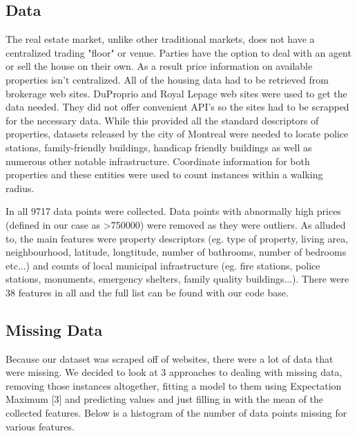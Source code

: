 \documentclass{acm_proc_article-sp}
\begin{document}
\subsection{Data}

	The real estate market, unlike other traditional markets, does not have a centralized trading "floor" or venue. Parties have the option to deal with an agent or sell the house on their own. As a result price information on available properties isn't centralized. All of the housing data had to be retrieved from brokerage web sites. DuProprio and Royal Lepage web sites were used to get the data needed. They did not offer convenient API's so the sites had to be scrapped for the necessary data. While this provided all the standard descriptors of properties, datasets released by the city of Montreal were needed to locate police stations, family-friendly buildings, handicap friendly buildings as well as numerous other notable infrastructure. Coordinate information for both properties and these entities were used to count instances within a walking radius.
	
	In all 9717 data points were collected. Data points with abnormally high prices (defined in our case as >750000) were removed as they were outliers. As alluded to, the main features were property descriptors (eg. type of property, living area, neighbourhood, latitude, longtitude, number of bathrooms, number of bedrooms etc...) and counts of local municipal infrastructure (eg. fire stations, police stations, monuments, emergency shelters, family quality buildings...). There were 38 features in all and the full list can be found with our code base.
	
\subsection{Missing Data}

	Because our dataset was scraped off of websites, there were a lot of data that were missing. We decided to look at 3 approaches to dealing with missing data, removing those instances altogether, fitting a model to them using Expectation Maximum [3] and predicting values and just filling in with the mean of the collected features. Below is a histogram of the number of data points missing  for various features.
	
\end{document}
